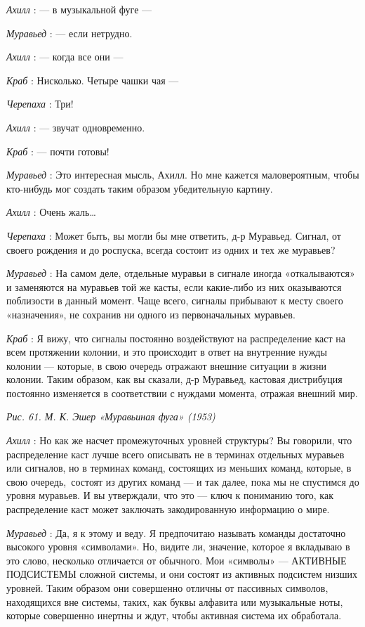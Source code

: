 \documentclass[../main.tex]{subfiles}
\begin{document}
\begin{dialogue}
\emph{Ахилл} : --- в музыкальной фуге ---

\emph{Муравьед} : --- если нетрудно.

\emph{Ахилл} : --- когда все они ---

\emph{Краб} : Нисколько. Четыре чашки чая ---

\emph{Черепаха} : Три!

\emph{Ахилл} : --- звучат одновременно.

\emph{Краб} : --- почти готовы!

\emph{Муравьед} : Это интересная мысль, Ахилл. Но мне кажется маловероятным, чтобы кто-нибудь мог создать таким образом убедительную картину.

\emph{Ахилл} : Очень жаль\ldots{}

\emph{Черепаха} : Может быть, вы могли бы мне ответить, д-р Муравьед. Сигнал, от своего рождения и до роспуска, всегда состоит из одних и тех же муравьев?

\emph{Муравьед} : На самом деле, отдельные муравьи в сигнале иногда «откалываются» и заменяются на муравьев той же касты, если какие-либо из них оказываются поблизости в данный момент. Чаще всего, сигналы прибывают к месту своего «назначения», не сохранив ни одного из первоначальных муравьев.

\emph{Краб} : Я вижу, что сигналы постоянно воздействуют на распределение каст на всем протяжении колонии, и это происходит в ответ на внутренние нужды колонии --- которые, в свою очередь отражают внешние ситуации в жизни колонии. Таким образом, как вы сказали, д-р Муравьед, кастовая дистрибуция постоянно изменяется в соответствии с нуждами момента, отражая внешний мир.

\emph{Рис. 61. М. К. Эшер «Муравьиная фуга» (1953)}

\emph{Ахилл} : Но как же насчет промежуточных уровней структуры? Вы говорили, что распределение каст лучше всего описывать не в терминах отдельных муравьев или сигналов, но в терминах команд, состоящих из меньших команд, которые, в свою очередь,~состоят из других команд --- и так далее, пока мы не спустимся до уровня муравьев. И вы утверждали, что это --- ключ к пониманию того, как распределение каст может заключать закодированную информацию о мире.

\emph{Муравьед} : Да, я к этому и веду. Я предпочитаю называть команды достаточно высокого уровня «символами». Но, видите ли, значение, которое я вкладываю в это слово, несколько отличается от обычного. Мои «символы» --- АКТИВНЫЕ ПОДСИСТЕМЫ сложной системы, и они состоят из активных подсистем низших уровней. Таким образом они совершенно отличны от пассивных символов, находящихся вне системы, таких, как буквы алфавита или музыкальные ноты, которые совершенно инертны и ждут, чтобы активная система их обработала.~


\end{dialogue}
\end{document}

